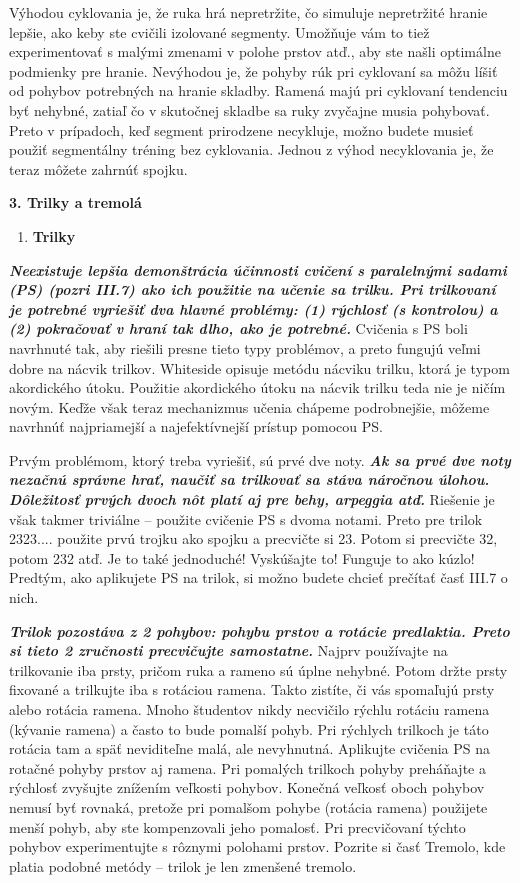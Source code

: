 \documentclass[11pt,a4paper%
]{book}
\begin{document}
Výhodou cyklovania je, že ruka hrá nepretržite, čo simuluje nepretržité hranie lepšie, ako keby ste cvičili izolované segmenty. Umožňuje vám to tiež experimentovať s malými zmenami v polohe prstov atď., aby ste našli optimálne podmienky pre hranie. Nevýhodou je, že pohyby rúk pri cyklovaní sa môžu líšiť od pohybov potrebných na hranie skladby. Ramená majú pri cyklovaní tendenciu byť nehybné, zatiaľ čo v skutočnej skladbe sa ruky zvyčajne musia pohybovať. Preto v prípadoch, keď segment prirodzene necykluje, možno budete musieť použiť segmentálny tréning bez cyklovania. Jednou z výhod necyklovania je, že teraz môžete zahrnúť spojku.

\textbf{3. Trilky a tremolá}

\begin{enumerate}
\def\labelenumi{\alph{enumi}.}
\item
  \textbf{Trilky}
\end{enumerate}

\emph{\textbf{Neexistuje lepšia demonštrácia účinnosti cvičení s paralelnými sadami (PS) (pozri III.7) ako ich použitie na učenie sa trilku. Pri trilkovaní je potrebné vyriešiť dva hlavné problémy: (1) rýchlosť (s kontrolou) a (2) pokračovať v hraní tak dlho, ako je potrebné.}} Cvičenia s PS boli navrhnuté tak, aby riešili presne tieto typy problémov, a preto fungujú veľmi dobre na nácvik trilkov. Whiteside opisuje metódu nácviku trilku, ktorá je typom akordického útoku. Použitie akordického útoku na nácvik trilku teda nie je ničím novým. Keďže však teraz mechanizmus učenia chápeme podrobnejšie, môžeme navrhnúť najpriamejší a najefektívnejší prístup pomocou PS.

Prvým problémom, ktorý treba vyriešiť, sú prvé dve noty. \emph{\textbf{Ak sa prvé dve noty nezačnú správne hrať, naučiť sa trilkovať sa stáva náročnou úlohou. Dôležitosť prvých dvoch nôt platí aj pre behy, arpeggia atď.}} Riešenie je však takmer triviálne -- použite cvičenie PS s dvoma notami. Preto pre trilok 2323.... použite prvú trojku ako spojku a precvičte si 23. Potom si precvičte 32, potom 232 atď. Je to také jednoduché! Vyskúšajte to! Funguje to ako kúzlo! Predtým, ako aplikujete PS na trilok, si možno budete chcieť prečítať časť III.7 o nich.

\emph{\textbf{Trilok pozostáva z 2 pohybov: pohybu prstov a rotácie predlaktia. Preto si tieto 2 zručnosti precvičujte samostatne.}} Najprv používajte na trilkovanie iba prsty, pričom ruka a rameno sú úplne nehybné. Potom držte prsty fixované a trilkujte iba s rotáciou ramena. Takto zistíte, či vás spomaľujú prsty alebo rotácia ramena. Mnoho študentov nikdy necvičilo rýchlu rotáciu ramena (kývanie ramena) a často to bude pomalší pohyb. Pri rýchlych trilkoch je táto rotácia tam a späť neviditeľne malá, ale nevyhnutná. Aplikujte cvičenia PS na rotačné pohyby prstov aj ramena. Pri pomalých trilkoch pohyby preháňajte a rýchlosť zvyšujte znížením veľkosti pohybov. Konečná veľkosť oboch pohybov nemusí byť rovnaká, pretože pri pomalšom pohybe (rotácia ramena) použijete menší pohyb, aby ste kompenzovali jeho pomalosť. Pri precvičovaní týchto pohybov experimentujte s rôznymi polohami prstov. Pozrite si časť Tremolo, kde platia podobné metódy -- trilok je len zmenšené tremolo.
\end{document}
